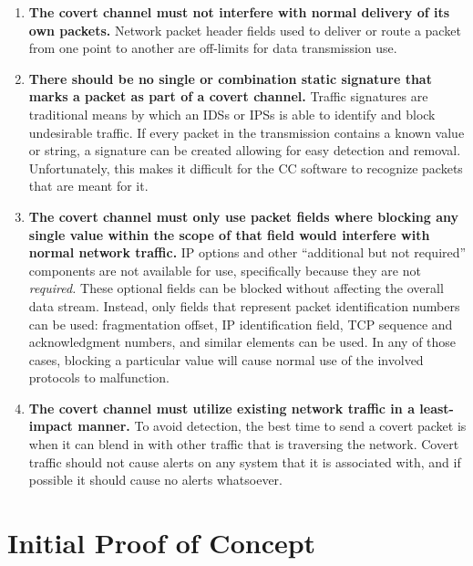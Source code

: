\documentclass[letterpaper,10pt,draft]{article}
\begin{document}
\begin{enumerate}

\item \textbf{The covert channel must not interfere with normal
delivery of its own packets.} Network packet header
fields used to deliver or route a packet from one point to another
are off-limits for data transmission use.

\item \textbf{There should be no single or combination static
signature that marks a packet as part of a covert channel.}  Traffic
signatures are traditional means by which an IDSs or IPSs is able to
identify and block undesirable traffic.  If every packet in the
transmission contains a known value or string, a signature can be
created allowing for easy detection and removal.  Unfortunately, this
makes it difficult for the CC software to recognize packets that are
meant for it.

\item \textbf{The covert channel must only use packet fields where
    blocking any single value within the scope of that field would
    interfere with normal network traffic.}  IP options and other
    ``additional but not required'' components are not available for
    use, specifically because they are not \textit{required.}  These
    optional fields can be blocked without affecting the overall data
    stream.  Instead, only fields that represent packet identification
    numbers can be used: fragmentation offset, IP identification
    field, TCP sequence and acknowledgment numbers, and similar
    elements can be used.  In any of those cases, blocking a
    particular value will cause normal use of the involved protocols
    to malfunction.

\item \textbf{The covert channel must utilize existing network traffic
in a least-impact manner.}  To avoid detection, the best time to send
a covert packet is when it can blend in with other traffic that is
traversing the network.  Covert traffic should not cause alerts on any
system that it is associated with, and if possible it should cause no
alerts whatsoever.
\end{enumerate}


\section{Initial Proof of Concept}
\end{document}
